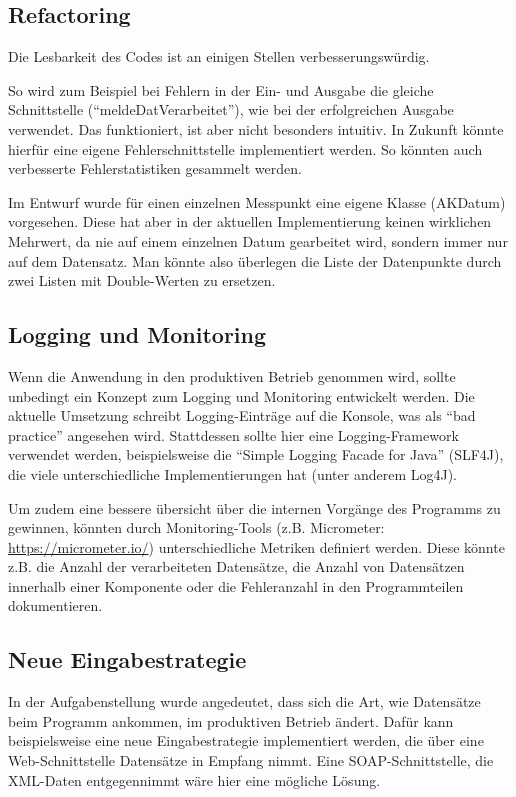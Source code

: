 \subsection{Refactoring}\label{subsec:refactoring}
Die Lesbarkeit des Codes ist an einigen Stellen verbesserungswürdig.

So wird zum Beispiel bei Fehlern in der Ein- und Ausgabe die gleiche Schnittstelle (\enquote{meldeDatVerarbeitet}), wie bei der erfolgreichen Ausgabe verwendet.
Das funktioniert, ist aber nicht besonders intuitiv.
In Zukunft könnte hierfür eine eigene Fehlerschnittstelle implementiert werden.
So könnten auch verbesserte Fehlerstatistiken gesammelt werden.

Im Entwurf wurde für einen einzelnen Messpunkt eine eigene Klasse (AKDatum) vorgesehen.
Diese hat aber in der aktuellen Implementierung keinen wirklichen Mehrwert, da nie auf einem einzelnen Datum gearbeitet wird, sondern immer nur auf dem Datensatz.
Man könnte also überlegen die Liste der Datenpunkte durch zwei Listen mit Double-Werten zu ersetzen.

\subsection{Logging und Monitoring}\label{subsec:log-moni}
Wenn die Anwendung in den produktiven Betrieb genommen wird, sollte unbedingt ein Konzept zum Logging und Monitoring entwickelt werden.
Die aktuelle Umsetzung schreibt Logging-Einträge auf die Konsole, was als \enquote{bad practice} angesehen wird.
Stattdessen sollte hier eine Logging-Framework verwendet werden, beispielsweise die \enquote{Simple Logging Facade for Java} (SLF4J), die viele unterschiedliche Implementierungen hat (unter anderem Log4J).

Um zudem eine bessere übersicht über die internen Vorgänge des Programms zu gewinnen, könnten durch Monitoring-Tools (z.B. Micrometer: \url{https://micrometer.io/}) unterschiedliche Metriken definiert werden.
Diese könnte z.B. die Anzahl der verarbeiteten Datensätze, die Anzahl von Datensätzen innerhalb einer Komponente oder die Fehleranzahl in den Programmteilen dokumentieren.

\subsection{Neue Eingabestrategie}\label{subsec:eingabestrat}
In der Aufgabenstellung wurde angedeutet, dass sich die Art, wie Datensätze beim Programm ankommen, im produktiven Betrieb ändert.
Dafür kann beispielsweise eine neue Eingabestrategie implementiert werden, die über eine Web-Schnittstelle Datensätze in Empfang nimmt.
Eine SOAP-Schnittstelle, die XML-Daten entgegennimmt wäre hier eine mögliche Lösung.

